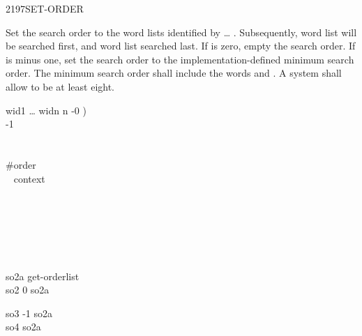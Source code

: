 \begin{worddef}{2197}{SET-ORDER}
\item {}

	Set the search order to the word lists identified by
	 {\ldots} . Subsequently, word list
	 will be searched first, and word list 
	searched last. If  is zero, empty the search order. If
	 is minus one, set the search order to the
	implementation-defined minimum search order. The minimum search
	order shall include the words  and
	. A system shall allow  to be at least
	eight.

	\begin{implement} %

		\word{:}   wid1 {\ldots} widn n -{}0 ) \\
		\tab {} -1 \word{=}  \\
		\tab[2]   \\
		\tab {} \\
		\tab {} \#order \word{!} \\
		  ~   context \word{+} \word{!} ~  \\
		\word{;}
	\end{implement}

	\begin{testing} %
		\ttfamily
		 \\%
		 \\%

		 \\
		 \\

		\word{:} so2a  get-orderlist  \word{;} \\
		\word{:} so2 0  so2a \word{;}

			\tab[1.5]  

		\word{:} so3 -1  so2a \word{;} \\
		\word{:} so4  so2a \word{;}

			\tab {} 
	\end{testing}
\end{worddef}



